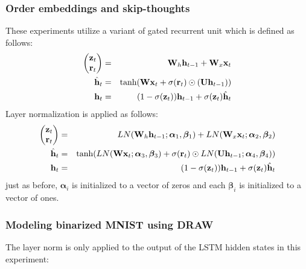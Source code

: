 \documentclass{article}
\begin{document}
\subsubsection*{Order embeddings and skip-thoughts}

These experiments utilize a variant of gated recurrent unit which is defined as follows:
\begin{eqnarray}
\begin{pmatrix}{\bf z}_t\\{\bf r}_t\end{pmatrix} &=& {\bf W}_h {\bf h}_{t-1} + {\bf W}_x {\bf x}_t \\
\hat{{\bf h}}_t &=& \text{tanh}({\bf W} {\bf x}_t + \sigma({\bf r}_t) \odot ({\bf U} {\bf h}_{t-1})) \\
{\bf h}_t &=& (1 - \sigma({\bf z}_t)) {\bf h}_{t-1} + \sigma({\bf z}_t) \hat{{\bf h}}_t
\end{eqnarray}
Layer normalization is applied as follows:
\begin{eqnarray}
\begin{pmatrix}{\bf z}_t\\{\bf r}_t\end{pmatrix} &=& LN({\bf W}_h {\bf h}_{t-1}; \bm{\alpha}_1, \bm{\beta}_1) + LN({\bf W}_x {\bf x}_t; \bm{\alpha}_2, \bm{\beta}_2) \\
\hat{{\bf h}}_t &=& \text{tanh}(LN({\bf W} {\bf x}_t; \bm{\alpha}_3, \bm{\beta}_3) + \sigma({\bf r}_t) \odot LN({\bf U} {\bf h}_{t-1}; \bm{\alpha}_4, \bm{\beta}_4)) \\
{\bf h}_t &=& (1 - \sigma({\bf z}_t)) {\bf h}_{t-1} + \sigma({\bf z}_t) \hat{{\bf h}}_t
\end{eqnarray}
just as before, $\bm{\alpha}_i$ is initialized to a vector of zeros and each $\bm{\beta}_i$ is initialized to a vector of ones.

\subsubsection*{Modeling binarized MNIST using DRAW}

The layer norm is only applied to the output of the LSTM hidden states in this experiment:
\end{document}
